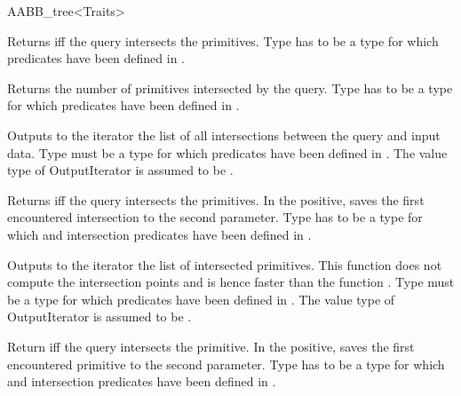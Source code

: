 \begin{ccRefClass}{AABB_tree<Traits>}
\ccOperations


{ Returns  iff the query intersects the primitives. Type  has to be a type for which  predicates have been defined in .}
	
{Returns the number of primitives intersected by the query. Type  has to be a type for which  predicates have been defined in .}
	
{Outputs to the iterator the list of all intersections between the query and input data. Type  must be a type for which  predicates have been defined in . The value type of OutputIterator is assumed to be .}

{Returns  iff the query intersects the primitives. In the positive, saves the first encountered intersection to the second parameter. Type  has to be a type for which  and intersection predicates have been defined in .}

{Outputs to the iterator the list of intersected primitives. This function does not compute the intersection points and is hence faster than the function . Type  must be a type for which  predicates have been defined in . The value type of OutputIterator is assumed to be .}

	
{Return  iff the query intersects the primitive. In the positive, saves the first encountered primitive to the second parameter. Type  has to be a type for which  and intersection predicates have been defined in .}



\end{ccRefClass}
